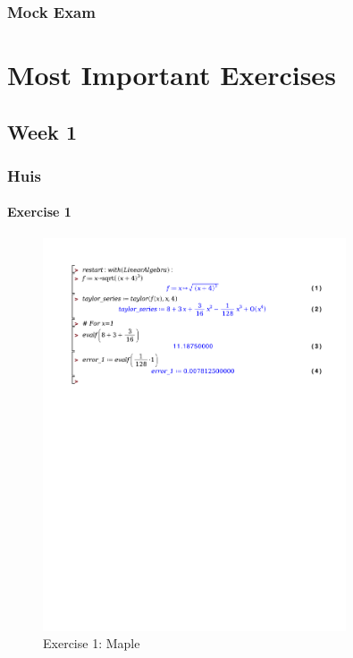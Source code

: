 \documentclass[a4paper]{report}
\begin{document}
\subsection*{Mock Exam}



\chapter{Most Important Exercises}

\section{Week 1}

\subsection{Huis}

\subsubsection{Exercise 1}

\begin{figure}[H]
	\centering
	\includegraphics[width=0.8\textwidth]{./exercises/huis_1_ex_1.pdf}
	\caption{Exercise 1: Maple}
\end{figure}
\end{document}

